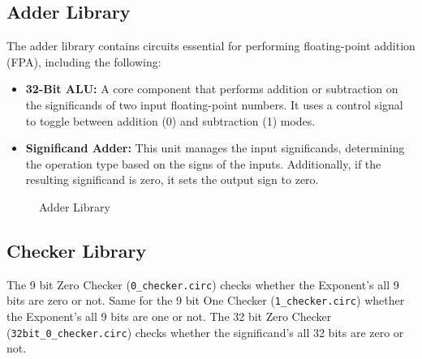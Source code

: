 \documentclass[a4paper,12pt]{article}
\begin{document}
\subsection{Adder Library}

The adder library contains circuits essential for performing floating-point
addition (FPA), including the following:

\begin{itemize}
    \item \textbf{32-Bit ALU:} A core component that performs addition or subtraction on the significands of two input floating-point numbers. It uses a control signal to toggle between addition (0) and subtraction (1) modes.

    \item \textbf{Significand Adder:} This unit manages the input significands, determining the operation type based on the signs of the inputs. Additionally, if the resulting significand is zero, it sets the output sign to zero.
\end{itemize}
\begin{figure}[H]
    \centering

    \hspace{1cm}

    \caption{Adder Library}
    \label{Significand Adder}
\end{figure}

\subsection{Checker Library}
The 9 bit Zero Checker (\texttt{0\_checker.circ}) checks whether the Exponent's
all 9 bits are zero or not. Same for the 9 bit One Checker
(\texttt{1\_checker.circ}) whether the Exponent's all 9 bits are one or not.
The 32 bit Zero Checker (\texttt{32bit\_0\_checker.circ}) checks whether the
significand's all 32 bits are zero or not.
\end{document}

